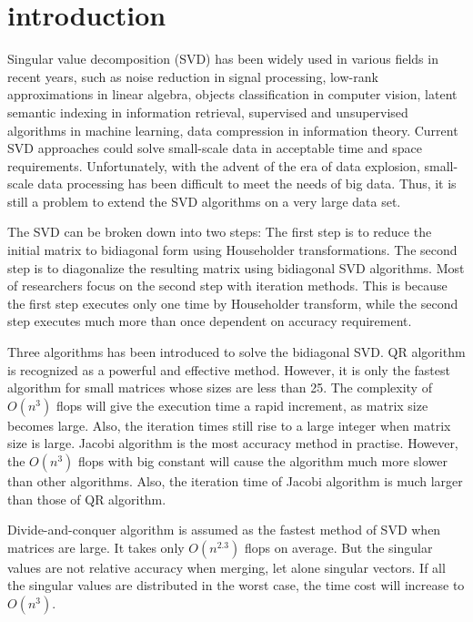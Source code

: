 \section{introduction}
Singular value decomposition (SVD) has been widely used in various fields in recent years,
such as noise reduction in signal processing,
low-rank approximations in linear algebra, 
objects classification in computer vision,
latent semantic indexing in information retrieval,
supervised and unsupervised algorithms in machine learning,
data compression in information theory.
Current SVD approaches could solve small-scale data in acceptable time and space requirements.
Unfortunately, with the advent of the era of data explosion, small-scale data processing has been difficult to meet the needs of big data.
Thus, it is still a problem to extend the SVD algorithms on a very large data set.

The SVD can be broken down into two steps\cite{65SIAM}:
The first step is to reduce the initial matrix to bidiagonal form using Householder transformations.
The second step is to diagonalize the resulting matrix using bidiagonal SVD algorithms.
Most of researchers focus on the second step with iteration methods\cite{58iter1,90iter2,65iter3}.
This is because the first step executes only one time by Householder transform,
while the second step executes much more than once dependent on accuracy requirement.

Three algorithms has been introduced to solve the bidiagonal SVD.
QR algorithm is recognized as a powerful and effective method.
However, it is only the fastest algorithm for small matrices whose sizes are less than 25\cite{97bookalgebra}.
The complexity of $O(n^3)$ flops will give the execution time a rapid increment, as matrix size becomes large.
Also, the iteration times still rise to a large integer when matrix size is large.
Jacobi algorithm is the most accuracy method in practise.
However, the $O(n^3)$ flops with big constant will cause the algorithm much more slower than other algorithms.
Also, the iteration time of Jacobi algorithm is much larger than those of QR algorithm.

Divide-and-conquer algorithm is assumed as the fastest method of SVD when matrices are large\cite{94DCSVD}.
It takes only $O(n^{2.3})$ flops on average\cite{97bookalgebra}.
But the singular values are not relative accuracy when merging, let alone singular vectors.
If all the singular values are distributed in the worst case, the time cost will increase to $O(n^3)$.

